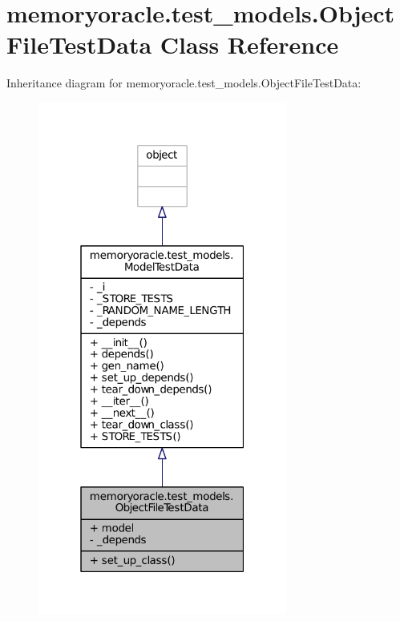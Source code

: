 \hypertarget{classmemoryoracle_1_1test__models_1_1ObjectFileTestData}{}\section{memoryoracle.\+test\+\_\+models.\+Object\+File\+Test\+Data Class Reference}
\label{classmemoryoracle_1_1test__models_1_1ObjectFileTestData}


Inheritance diagram for memoryoracle.\+test\+\_\+models.\+Object\+File\+Test\+Data\+:\nopagebreak
\begin{figure}[H]
\begin{center}
\leavevmode
\includegraphics[width=232pt]{classmemoryoracle_1_1test__models_1_1ObjectFileTestData__inherit__graph}
\end{center}
\end{figure}


